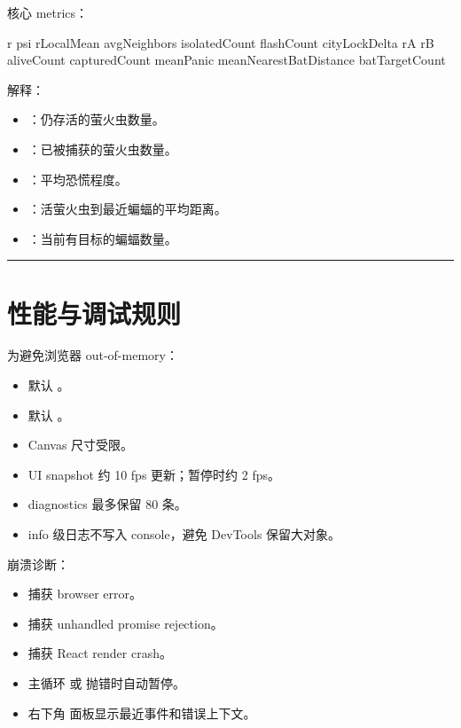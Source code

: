 \documentclass[UTF8]{ctexart}
\begin{document}
核心 metrics：

\begin{codeblock}
r
psi
rLocalMean
avgNeighbors
isolatedCount
flashCount
cityLockDelta
rA
rB
aliveCount
capturedCount
meanPanic
meanNearestBatDistance
batTargetCount
\end{codeblock}

解释：

\begin{itemize}
\item \texttt{}：仍存活的萤火虫数量。
\item \texttt{}：已被捕获的萤火虫数量。
\item \texttt{}：平均恐慌程度。
\item \texttt{}：活萤火虫到最近蝙蝠的平均距离。
\item \texttt{}：当前有目标的蝙蝠数量。
\end{itemize}

\bigskip
\hrule
\bigskip

\section{性能与调试规则}

为避免浏览器 out-of-memory：

\begin{itemize}
\item 默认 \texttt{}。
\item 默认 \texttt{}。
\item Canvas 尺寸受限。
\item UI snapshot 约 10 fps 更新；暂停时约 2 fps。
\item diagnostics 最多保留 80 条。
\item info 级日志不写入 console，避免 DevTools 保留大对象。
\end{itemize}

崩溃诊断：

\begin{itemize}
\item 捕获 browser error。
\item 捕获 unhandled promise rejection。
\item 捕获 React render crash。
\item 主循环 \texttt{} 或 \texttt{} 抛错时自动暂停。
\item 右下角 \texttt{} 面板显示最近事件和错误上下文。
\end{itemize}
\end{document}
